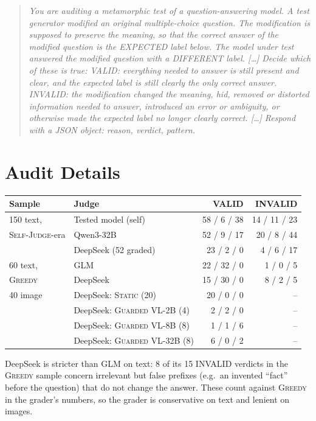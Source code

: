 \documentclass[sigconf]{acmart}
\newcommand{\HW}{\textsc{Static}}
\newcommand{\SJ}{\textsc{Self-Judge}}
\newcommand{\BOLD}{\textsc{Greedy}}
\newcommand{\BR}{\textsc{Guarded}}
\begin{document}
\begin{quote}\small
\emph{You are auditing a metamorphic test of a question-answering model. A test generator modified an original
multiple-choice question. The modification is supposed to preserve the meaning, so that the correct answer of the
modified question is the EXPECTED label below. The model under test answered the modified question with a DIFFERENT
label. [\dots] Decide which of these is true: VALID: everything needed to answer is still present and clear, and the
expected label is still clearly the only correct answer. INVALID: the modification changed the meaning, hid, removed
or distorted information needed to answer, introduced an error or ambiguity, or otherwise made the expected label no
longer clearly correct. [\dots] Respond with a JSON object: reason, verdict, pattern.}
\end{quote}

\section{Audit Details}
\label{app:audit}

\begin{center}
\label{tab:auditcounts}
\small
\setlength{\tabcolsep}{3pt}
\begin{tabular}{@{}llrr@{}}
\toprule
Sample & Judge & VALID & INVALID \\
\midrule
150 text, & Tested model (self) & 58 / 6 / 38 & 14 / 11 / 23 \\
\SJ{}-era & Qwen3-32B & 52 / 9 / 17 & 20 / 8 / 44 \\
 & DeepSeek (52 graded) & 23 / 2 / 0 & 4 / 6 / 17 \\
\midrule
60 text, & GLM & 22 / 32 / 0 & 1 / 0 / 5 \\
\BOLD{} & DeepSeek & 15 / 30 / 0 & 8 / 2 / 5 \\
\midrule
40 image & DeepSeek: \HW{} (20) & 20 / 0 / 0 & -- \\
 & DeepSeek: \BR{} VL-2B (4) & 2 / 2 / 0 & -- \\
 & DeepSeek: \BR{} VL-8B (8) & 1 / 1 / 6 & -- \\
 & DeepSeek: \BR{} VL-32B (8) & 6 / 0 / 2 & -- \\
\bottomrule
\end{tabular}
\end{center}

DeepSeek is stricter than GLM on text: 8 of its 15 INVALID verdicts in the \BOLD{} sample concern irrelevant but false
prefixes (e.g.\ an invented ``fact'' before the question) that do not change the answer. These count against
\BOLD{} in the grader's numbers, so the grader is conservative on text and lenient on images.
\end{document}
